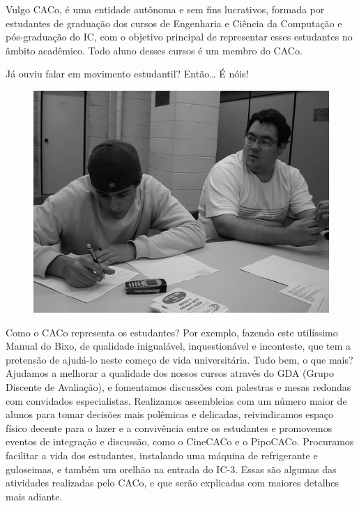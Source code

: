 Vulgo CACo, é uma entidade autônoma e sem fins
lucrativos, formada por estudantes de graduação dos cursos de Engenharia
e Ciência da Computação e pós-graduação do IC, com o objetivo principal de
representar esses estudantes no âmbito acadêmico. Todo aluno desses cursos é um
membro do CACo.

Já ouviu falar em movimento estudantil? Então{\dots} É nóis!
\begin{figure}[h!]
    \vspace{-10pt}
    \centering
    \includegraphics[scale=0.58, keepaspectratio=true]{img/imgs/21-CACo/-123.jpg}
    \vspace{-10pt}
\end{figure}

Como o CACo representa os estudantes? Por exemplo, fazendo este utilíssimo
Manual do Bixo, de qualidade inigualável, inquestionável e inconteste, que tem
a pretensão de ajudá-lo neste começo de vida universitária. Tudo bem, o que
mais? Ajudamos a melhorar a qualidade dos nossos cursos através do GDA (Grupo
Discente de Avaliação), e fomentamos discussões com palestras e mesas redondas
com convidados especialistas. Realizamos assembleias com um número maior de
alunos para tomar decisões mais polêmicas e delicadas, reivindicamos espaço
físico decente para o lazer e a convivência entre os estudantes e promovemos
eventos de integração e discussão, como o CineCACo e o PipoCACo. Procuramos
facilitar a vida dos estudantes, instalando uma máquina de refrigerante
e guloseimas, e também um orelhão na entrada do IC-3. 
Essas são algumas das atividades realizadas pelo CACo, e que serão explicadas
com maiores detalhes mais adiante.

